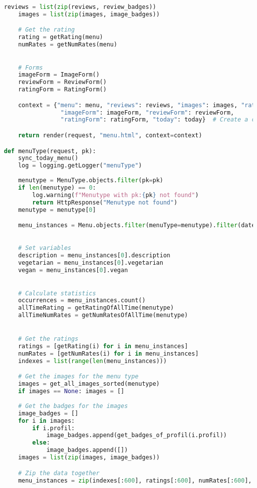 \begin{lstlisting}[language=Python]
    reviews = list(zip(reviews, review_badges))
    images = list(zip(images, image_badges))

    # Get the rating
    rating = getRating(menu)
    numRates = getNumRates(menu)
    

    # Forms
    imageForm = ImageForm()
    reviewForm = ReviewForm()
    ratingForm = RatingForm()

    context = {"menu": menu, "reviews": reviews, "images": images, "rating": rating, "numRates": numRates,
                "imageForm": imageForm, "reviewForm": reviewForm,
                "ratingForm": ratingForm, "today": today}  # Create a context dictionary to pass to the template

    return render(request, "menu.html", context=context)

def menuType(request, pk):
    sync_today_menu()
    log = logging.getLogger("menuType")
    
    menutype = MenuType.objects.filter(pk=pk)
    if len(menutype) == 0:
        log.warning(f"Menutype with pk:{pk} not found")
        return HttpResponse("Menutype not found")
    menutype = menutype[0]

    menu_instances = Menu.objects.filter(menuType=menutype).filter(date__lte=dt.date.today()).order_by("-date")
    

    # Set variables
    description = menu_instances[0].description
    vegetarian = menu_instances[0].vegetarian
    vegan = menu_instances[0].vegan

    
    # Calculate statistics
    occurrences = menu_instances.count()
    allTimeRating = getRatingOfAllTime(menutype)
    allTimeNumRates = getNumRatesOfAllTime(menutype)


    # Get the ratings
    ratings = [getRating(i) for i in menu_instances]
    numRates = [getNumRates(i) for i in menu_instances]
    indexes = list(range(len(menu_instances)))

    # Get the images for the menu type
    images = get_all_images_sorted(menutype)
    if images == None: images = []
    
    # Get the badges for the images
    image_badges = []
    for i in images:
        if i.profil:
            image_badges.append(get_badges_of_profil(i.profil))
        else:
            image_badges.append([])
    images = list(zip(images, image_badges))

    # Zip the data together
    menu_instances = zip(indexes[:600], ratings[:600], numRates[:600], menu_instances[:600])


\end{lstlisting}
